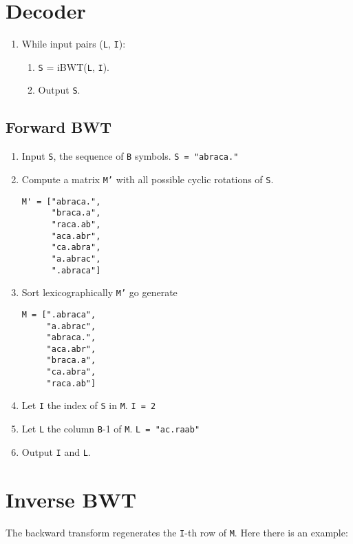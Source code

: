 \section{Decoder}

\begin{enumerate}
\tightlist
\item
  While input pairs (\texttt{L}, \texttt{I}):
  \begin{enumerate}
  \tightlist
  \item
    \texttt{S} = iBWT(\texttt{L}, \texttt{I}).
  \item
    Output \texttt{S}.
  \end{enumerate}
\end{enumerate}

\subsection{Forward BWT}

\begin{enumerate}
\item
  Input \texttt{S}, the sequence of \texttt{B} symbols.
  \texttt{S\ =\ "abraca."}
\item
  Compute a matrix \texttt{M'} with all possible cyclic
  rotations of \texttt{S}.

\begin{verbatim}
M' = ["abraca.",
      "braca.a",
      "raca.ab",
      "aca.abr",
      "ca.abra",
      "a.abrac",
      ".abraca"]
\end{verbatim}
\item
  Sort lexicographically \texttt{M'} go generate
\begin{verbatim}
M = [".abraca",
     "a.abrac",
     "abraca.",
     "aca.abr",
     "braca.a",
     "ca.abra",
     "raca.ab"]
\end{verbatim}
\item
  Let \texttt{I} the index of \texttt{S} in \texttt{M}. \texttt{I\ =\ 2}
\item
  Let \texttt{L} the column \texttt{B}-1 of \texttt{M}.
  \texttt{L\ =\ "ac.raab"}
\item
  Output \texttt{I} and \texttt{L}.
\end{enumerate}

\section{Inverse BWT}

The backward transform regenerates the \texttt{I}-th row of \texttt{M}.
Here there is an example:

